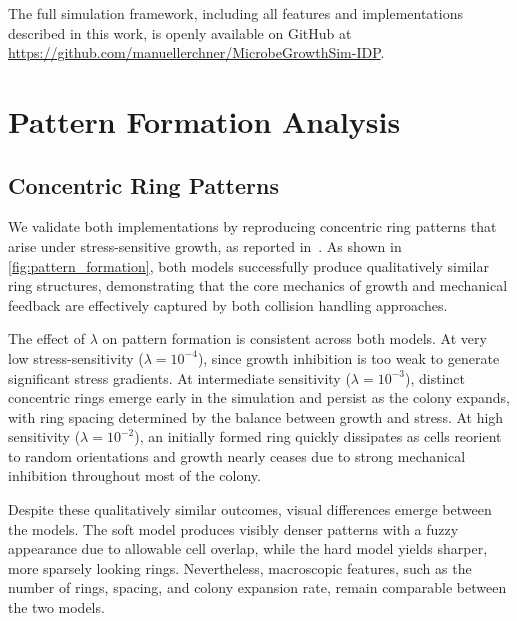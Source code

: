 \documentclass[conference]{IEEEtran}
\begin{document}
The full simulation framework, including all features and implementations described in this work, is openly available on GitHub at \url{https://github.com/manuellerchner/MicrobeGrowthSim-IDP}.

\newpage

\section{Pattern Formation Analysis}

\subsection{Concentric Ring Patterns}

We validate both implementations by reproducing concentric ring patterns that arise under stress-sensitive growth, as reported in~\cite{Weady2024}. As shown in \autoref{fig:pattern_formation}, both models successfully produce qualitatively similar ring structures, demonstrating that the core mechanics of growth and mechanical feedback are effectively captured by both collision handling approaches.

The effect of $\lambda$ on pattern formation is consistent across both models. At very low stress-sensitivity ($\lambda = 10^{-4}$), since growth inhibition is too weak to generate significant stress gradients. At intermediate sensitivity ($\lambda = 10^{-3}$), distinct concentric rings emerge early in the simulation and persist as the colony expands, with ring spacing determined by the balance between growth and stress. At high sensitivity ($\lambda = 10^{-2}$), an initially formed ring quickly dissipates as cells reorient to random orientations and growth nearly ceases due to strong mechanical inhibition throughout most of the colony.

Despite these qualitatively similar outcomes, visual differences emerge between the models. The soft model produces visibly denser patterns with a fuzzy appearance due to allowable cell overlap, while the hard model yields sharper, more sparsely looking rings. Nevertheless, macroscopic features, such as the number of rings, spacing, and colony expansion rate, remain comparable between the two models.
\end{document}
